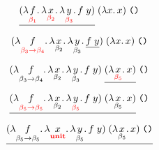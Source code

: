 \documentclass[12pt]{article}
\begin{document}
\pagestyle{empty}

\[
    \underline{(\lambda \underset{\color{red} \beta_1}{f}\ldotp \lambda \underset{\color{red} \beta_2}{x}\ldotp \lambda \underset{\color{red} \beta_3}{y}\ldotp f\; y)}\; (\lambda x\ldotp x)\;\text{\texttt{()}}
\]

\[
    (\lambda \underset{\color{red} \beta_3 \to \beta_4}{f}\ldotp \lambda \underset{\beta_2}{x}\ldotp \lambda \underset{\beta_3}{y}\ldotp \underline{f\; y})\; (\lambda x\ldotp x)\;\text{\texttt{()}}
\]

\[
    (\lambda \underset{\beta_3 \to \beta_4}{f}\ldotp \lambda \underset{\beta_2}{x}\ldotp \lambda \underset{\beta_3}{y}\ldotp f\; y)\; \underline{(\lambda \underset{\color{red} \beta_5}{x}\ldotp x)}\;\text{\texttt{()}}
\]

\[
    \underline{(\lambda \underset{\color{red} \beta_5 \to \beta_5}{f}\ldotp \lambda \underset{\beta_2}{x}\ldotp \lambda \underset{\color{red} \beta_5}{y}\ldotp f\; y)\; (\lambda \underset{\beta_5}{x}\ldotp x)}\;\text{\texttt{()}}
\]

\[
    \underline{(\lambda \underset{\beta_5 \to \beta_5}{f}\ldotp \lambda \underset{\color{red} \mathbf{unit}}{x}\ldotp \lambda \underset{\beta_5}{y}\ldotp f\; y)\; (\lambda \underset{\beta_5}{x}\ldotp x)\;\text{\texttt{()}}}
\]
\end{document}
